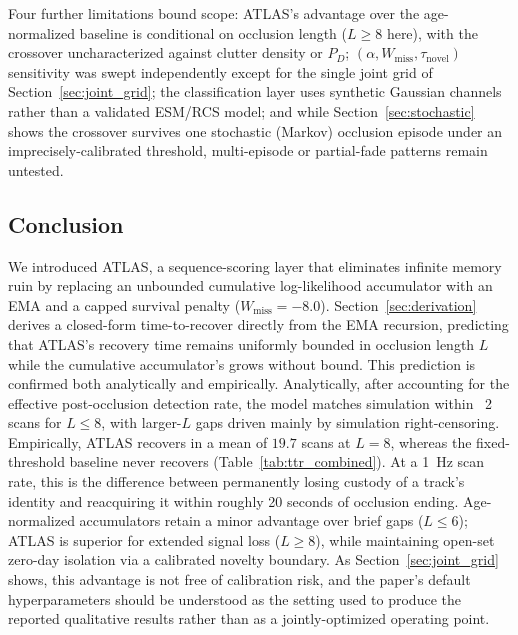 \documentclass[conference]{IEEEtran}
\begin{document}
Four further limitations bound scope: ATLAS's advantage over the age-normalized baseline is conditional on occlusion length ($L\ge8$ here), with the crossover uncharacterized against clutter density or $P_D$; $(\alpha,W_{\text{miss}},\tau_{\text{novel}})$ sensitivity was swept independently except for the single joint grid of Section~\ref{sec:joint_grid}; the classification layer uses synthetic Gaussian channels rather than a validated ESM/RCS model; and while Section~\ref{sec:stochastic} shows the crossover survives one stochastic (Markov) occlusion episode under an imprecisely-calibrated threshold, multi-episode or partial-fade patterns remain untested.

\subsection{Conclusion}
We introduced ATLAS, a sequence-scoring layer that eliminates infinite memory ruin by replacing an unbounded cumulative log-likelihood accumulator with an EMA and a capped survival penalty ($W_{\text{miss}}=-8.0$). Section~\ref{sec:derivation} derives a closed-form time-to-recover directly from the EMA recursion, predicting that ATLAS's recovery time remains uniformly bounded in occlusion length $L$ while the cumulative accumulator's grows without bound. This prediction is confirmed both analytically and empirically. Analytically, after accounting for the effective post-occlusion detection rate, the model matches simulation within ~2 scans for $L\le8$, with larger-$L$ gaps driven mainly by simulation right-censoring. Empirically, ATLAS recovers in a mean of $19.7$ scans at $L=8$, whereas the fixed-threshold baseline never recovers (Table~\ref{tab:ttr_combined}). At a 1~Hz scan rate, this is the difference between permanently losing custody of a track's identity and reacquiring it within roughly 20 seconds of occlusion ending. Age-normalized accumulators retain a minor advantage over brief gaps ($L\le6$); ATLAS is superior for extended signal loss ($L\ge8$), while maintaining open-set zero-day isolation via a calibrated novelty boundary. As Section~\ref{sec:joint_grid} shows, this advantage is not free of calibration risk, and the paper's default hyperparameters should be understood as the setting used to produce the reported qualitative results rather than as a jointly-optimized operating point.
\end{document}
